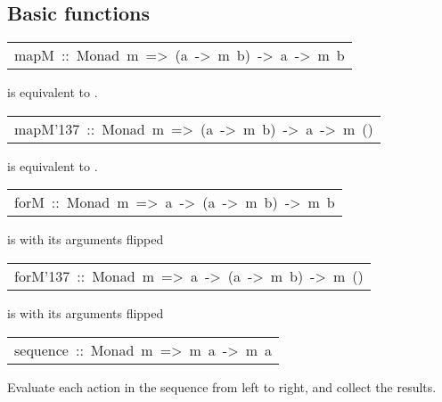 \subsection{Basic  functions
}
\begin{haddockdesc}
\item[\begin{tabular}{@{}l}
mapM\ ::\ Monad\ m\ =>\ (a\ ->\ m\ b)\ ->\ {\char 91}a{\char 93}\ ->\ m\ {\char 91}b{\char 93}
\end{tabular}]\haddockbegindoc
{} is equivalent to .
\par

\end{haddockdesc}
\begin{haddockdesc}
\item[\begin{tabular}{@{}l}
mapM{\char '137}\ ::\ Monad\ m\ =>\ (a\ ->\ m\ b)\ ->\ {\char 91}a{\char 93}\ ->\ m\ ()
\end{tabular}]\haddockbegindoc
{} is equivalent to .
\par

\end{haddockdesc}
\begin{haddockdesc}
\item[\begin{tabular}{@{}l}
forM\ ::\ Monad\ m\ =>\ {\char 91}a{\char 93}\ ->\ (a\ ->\ m\ b)\ ->\ m\ {\char 91}b{\char 93}
\end{tabular}]\haddockbegindoc
{} is  with its arguments flipped
\par

\end{haddockdesc}
\begin{haddockdesc}
\item[\begin{tabular}{@{}l}
forM{\char '137}\ ::\ Monad\ m\ =>\ {\char 91}a{\char 93}\ ->\ (a\ ->\ m\ b)\ ->\ m\ ()
\end{tabular}]\haddockbegindoc
{} is  with its arguments flipped
\par

\end{haddockdesc}
\begin{haddockdesc}
\item[\begin{tabular}{@{}l}
sequence\ ::\ Monad\ m\ =>\ {\char 91}m\ a{\char 93}\ ->\ m\ {\char 91}a{\char 93}
\end{tabular}]\haddockbegindoc
Evaluate each action in the sequence from left to right,
 and collect the results.
\par

\end{haddockdesc}
